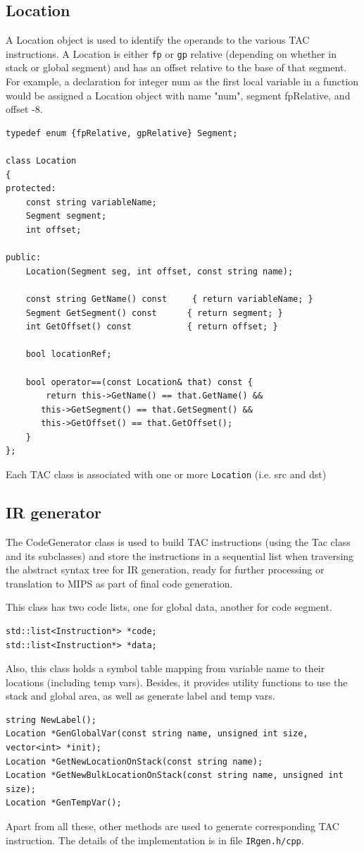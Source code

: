 \documentclass[11pt]{article}
\begin{document}
\subsection{Location}
\label{sec:orgheadline20}
A Location object is used to identify the operands to the various TAC
instructions. A Location is either \texttt{fp} or \texttt{gp} 
relative (depending on whether in stack or global segment) 
and has an offset relative to the base of that segment.
For example, a declaration for integer num as the first local
variable in a function would be assigned a Location object
with name "num", segment fpRelative, and offset -8.
\begin{verbatim}
typedef enum {fpRelative, gpRelative} Segment;

class Location
{
protected:
    const string variableName;
    Segment segment;
    int offset;

public:
    Location(Segment seg, int offset, const string name);

    const string GetName() const     { return variableName; }
    Segment GetSegment() const      { return segment; }
    int GetOffset() const           { return offset; }

    bool locationRef;

    bool operator==(const Location& that) const {
        return this->GetName() == that.GetName() &&
       this->GetSegment() == that.GetSegment() &&
       this->GetOffset() == that.GetOffset();
    }
};
\end{verbatim}
Each TAC class is associated with one or more \texttt{Location} (i.e. src and dst)
\subsection{IR generator}
\label{sec:orgheadline21}
  The CodeGenerator class is used to build TAC
instructions (using the Tac class and its subclasses) and store the
instructions in a sequential list when traversing the abstract syntax tree for
IR generation, ready for further processing or translation to MIPS as part of
final code generation. 

This class has two code lists, one for global data, another for code segment.
\begin{verbatim}
std::list<Instruction*> *code;
std::list<Instruction*> *data;
\end{verbatim}
Also, this class holds a symbol table mapping from variable name to their
locations (including temp vars). Besides, it provides utility functions to
use the stack and global area, as well as generate label and temp vars.
\begin{verbatim}
string NewLabel();
Location *GenGlobalVar(const string name, unsigned int size, vector<int> *init);
Location *GetNewLocationOnStack(const string name);
Location *GetNewBulkLocationOnStack(const string name, unsigned int size);
Location *GenTempVar();
\end{verbatim}
Apart from all these, other methods are used to generate corresponding TAC
instruction. The details of the implementation is in file \texttt{IRgen.h/cpp}.
\end{document}
